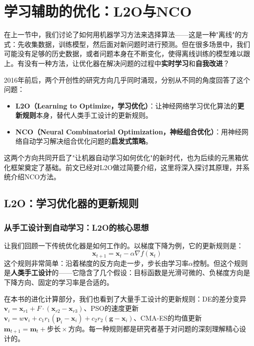 \documentclass[lang=cn,zihao=-4,a4paper,fontset=windows]{beautybook}
\begin{document}
\section{学习辅助的优化：L2O与NCO}

在上一节中，我们讨论了如何用机器学习方法来选择算法——这是一种"离线"的方式：先收集数据，训练模型，然后面对新问题时进行预测。但在很多场景中，我们可能没有足够的历史数据，或者问题本身在不断变化，使得离线训练的模型难以跟上。有没有一种方法，让优化器在解决问题的过程中\textbf{实时学习}和\textbf{自我改进}？

2016年前后，两个开创性的研究方向几乎同时涌现，分别从不同的角度回答了这个问题：

\begin{itemize}
    \item \textbf{L2O（Learning to Optimize，学习优化）}：让神经网络学习优化算法的\textbf{更新规则}本身，替代人类手工设计的更新规则。
    \item \textbf{NCO（Neural Combinatorial Optimization，神经组合优化）}：用神经网络自动学习解决组合优化问题的\textbf{启发式策略}。
\end{itemize}

这两个方向共同开启了"让机器自动学习如何优化"的新时代，也为后续的元黑箱优化框架奠定了基础。前文已经对L2O做过简要介绍，这里将深入探讨其原理，并系统介绍NCO方法。

\subsection{L2O：学习优化器的更新规则}

\subsubsection{从手工设计到自动学习：L2O的核心思想}

让我们回顾一下传统优化器是如何工作的。以梯度下降为例，它的更新规则是：
\[
\mathbf{x}_{t+1} = \mathbf{x}_t - \alpha \nabla f(\mathbf{x}_t)
\]
这个规则非常简单：沿着梯度的反方向走一步，步长由学习率$\alpha$控制。但这个规则是\textbf{人类手工设计}的——它隐含了几个假设：目标函数是光滑可微的、负梯度方向是下降方向、固定的学习率是合适的。

在本书的进化计算部分，我们也看到了大量手工设计的更新规则：DE的差分变异$\mathbf{v}_i = \mathbf{x}_{r1} + F \cdot (\mathbf{x}_{r2} - \mathbf{x}_{r3})$、PSO的速度更新$\mathbf{v}_i = w\mathbf{v}_i + c_1 r_1 (\mathbf{p}_i - \mathbf{x}_i) + c_2 r_2 (\mathbf{g} - \mathbf{x}_i)$、CMA-ES的均值更新$\mathbf{m}_{t+1} = \mathbf{m}_t + \text{步长} \times \text{方向}$。每一种规则都是研究者基于对问题的深刻理解精心设计的。
\end{document}
